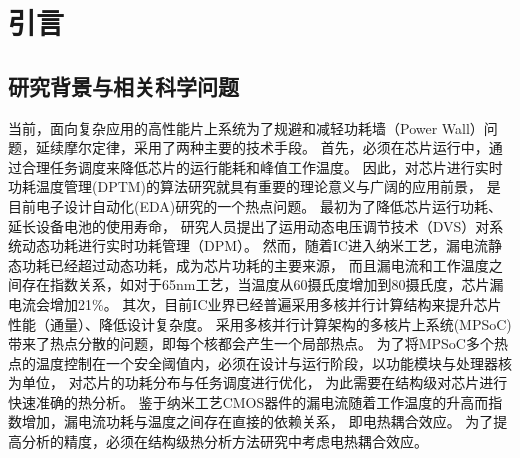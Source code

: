 


\chapter{引言}
\label{cha:intro}


\section{研究背景与相关科学问题}
当前，面向复杂应用的高性能片上系统为了规避和减轻功耗墙（Power Wall）问题，延续摩尔定律，采用了两种主要的技术手段。
首先，必须在芯片运行中，通过合理任务调度来降低芯片的运行能耗和峰值工作温度。 因此，对芯片进行实时功耗温度管理(DPTM)的算法研究就具有重要的理论意义与广阔的应用前景， 是目前电子设计自动化(EDA)研究的一个热点问题。
最初为了降低芯片运行功耗、延长设备电池的使用寿命， 研究人员提出了运用动态电压调节技术（DVS）对系统动态功耗进行实时功耗管理（DPM）。 然而，随着IC进入纳米工艺，漏电流静态功耗已经超过动态功耗，成为芯片功耗的主要来源， 而且漏电流和工作温度之间存在指数关系，如对于65nm工艺，当温度从60摄氏度增加到80摄氏度，芯片漏电流会增加21\%。
其次，目前IC业界已经普遍采用多核并行计算结构来提升芯片性能（通量）、降低设计复杂度。 采用多核并行计算架构的多核片上系统(MPSoC)带来了热点分散的问题，即每个核都会产生一个局部热点。 为了将MPSoC多个热点的温度控制在一个安全阈值内，必须在设计与运行阶段，以功能模块与处理器核为单位， 对芯片的功耗分布与任务调度进行优化， 为此需要在结构级对芯片进行快速准确的热分析。 鉴于纳米工艺CMOS器件的漏电流随着工作温度的升高而指数增加，漏电流功耗与温度之间存在直接的依赖关系， 即电热耦合效应。 为了提高分析的精度，必须在结构级热分析方法研究中考虑电热耦合效应。

